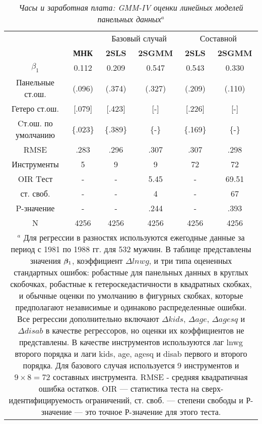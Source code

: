\begin{table}[ht]
\caption{{\it  Часы и заработная плата: GMM-IV оценки линейных моделей панельных данных$^a$}} 
\centering
\begin{tabular}{cccccc}
\hline \hline
 & &	\multicolumn{2}{c}{Базовый случай} & \multicolumn{2}{c}{Составной}  \\
 & \textbf{МНК} &	\textbf{2SLS} & \textbf{2SGMM} & \textbf{2SLS} & \textbf{2SGMM}   \\
\hline
 $\beta_1$ & 0.112 &	0.209 & 0.547 & 0.543 & 0.330   \\
Панельные ст.ош. & (.096) &	 (.374)  & (.327)  & (.209) & (.110)   \\
Гетеро ст.ош. & [.079] & [.423] & [-] & [.226] & [-]   \\
Cт.ош. по умолчанию & \{.023\} &	 \{.389\}  & \{-\}  & \{.169\} & \{-\}   \\
RMSE & .283 &	 .296  & .307  & .307 & .298   \\
Инструменты & 5 &	 9  & 9  & 72 & 72   \\
OIR Tест & - &	 -  & 5.45  & - & 69.51   \\
ст. своб. & - &	 -  & 4  & - & 67   \\
P-значение & - &	 -  & .244  & - & .393   \\
N & 4256 & 4256  & 4256  & 4256 & 4256   \\
\hline \hline
\multicolumn{6}{p{14cm}}{$^a$ Для регрессии в разностях используются ежегодные данные за период с 1981 по 1988 гг. для 532 мужчин. В таблице представлены значения $\bm{\beta}_1$, коэффициент $\Delta lnwg$, и три типа оцененных стандартных ошибок: робастные для панельных данных в круглых скобочках, робастные к гетероскедастичности в квадратных скобках, и обычные оценки по умолчанию в фигурных скобках, которые предполагают независимые и одинаково распределенные ошибки. Все регрессии дополнительно включают $\Delta kids$, $\Delta age$, $\Delta agesq$ и $\Delta disab$ в качестве регрессоров, но оценки их коэффициентов не представлены. В качестве инструментов используются лаг lnwg второго порядка и лаги  kids, age, agesq и disab первого и второго порядка. Для базового случая используется 9 инструментов и $9 \times 8=72$ составных инструмента. RMSE -  средняя квадратичная ошибка остатков. OIR --- статистика теста на сверх-идентифицируемость ограничений, ст. своб. --- степени свободы и Р-значение --- это точное Р-значение для этого теста.}\\
\end{tabular}
\label{Tab:22.2}
\end{table}

